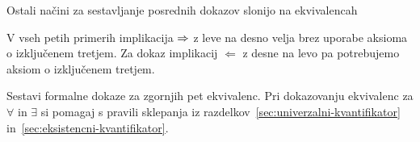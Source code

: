 Ostali načini za sestavljanje posrednih dokazov slonijo na
ekvivalencah
%
%
V vseh petih primerih implikacija $\Rightarrow$ z leve na desno velja brez
uporabe aksioma o izključenem tretjem. Za dokaz implikacij
$\Leftarrow$ z desne na levo pa potrebujemo aksiom o izključenem
tretjem.

\begin{vaja}
  Sestavi formalne dokaze za zgornjih pet ekvivalenc. Pri dokazovanju
  ekvivalenc za $\forall$ in $\exists$ si pomagaj s pravili sklepanja
  iz razdelkov~\ref{sec:univerzalni-kvantifikator}
  in~\ref{sec:eksistencni-kvantifikator}.
\end{vaja}

